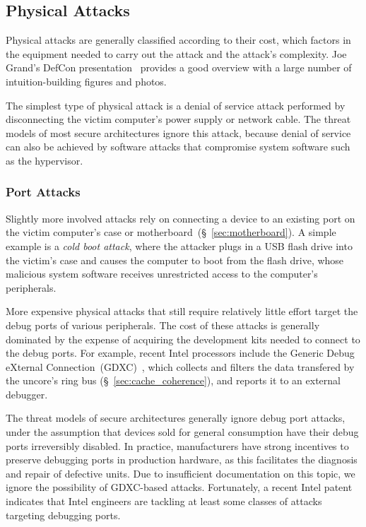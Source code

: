 \subsection{Physical Attacks}
\label{sec:physical_attacks}

Physical attacks are generally classified according to their cost, which
factors in the equipment needed to carry out the attack and the attack's
complexity. Joe Grand's DefCon presentation~\cite{grand2004physicalattacks}
provides a good overview with a large number of intuition-building figures and
photos.

The simplest type of physical attack is a denial of service attack performed by
disconnecting the victim computer's power supply or network cable. The threat
models of most secure architectures ignore this attack, because denial of
service can also be achieved by software attacks that compromise system
software such as the hypervisor.


\subsubsection{Port Attacks}
\label{sec:physical_port_attacks}

Slightly more involved attacks rely on connecting a device to an existing port
on the victim computer's case or motherboard~(\S~\ref{sec:motherboard}). A
simple example is a \textit{cold boot attack}, where the attacker plugs in a
USB flash drive into the victim's case and causes the computer to boot from
the flash drive, whose malicious system software receives unrestricted access
to the computer's peripherals.

More expensive physical attacks that still require relatively little effort
target the debug ports of various peripherals. The cost of these attacks is
generally dominated by the expense of acquiring the development kits needed to
connect to the debug ports. For example, recent Intel processors include the
Generic Debug eXternal Connection~(GDXC)~\cite{yuffe2011sandybridge,
intel2011gdxc}, which collects and filters the data transfered by the uncore's
ring bus (\S~\ref{sec:cache_coherence}), and reports it to an external
debugger.

The threat models of secure architectures generally ignore debug port attacks,
under the assumption that devices sold for general consumption have their debug
ports irreversibly disabled. In practice, manufacturers have strong incentives
to preserve debugging ports in production hardware, as this facilitates the
diagnosis and repair of defective units. Due to insufficient documentation on
this topic, we ignore the possibility of GDXC-based attacks. Fortunately, a
recent Intel patent~\cite{shanbhogue2015gdxcsgx} indicates that Intel engineers
are tackling at least some classes of attacks targeting debugging ports.


